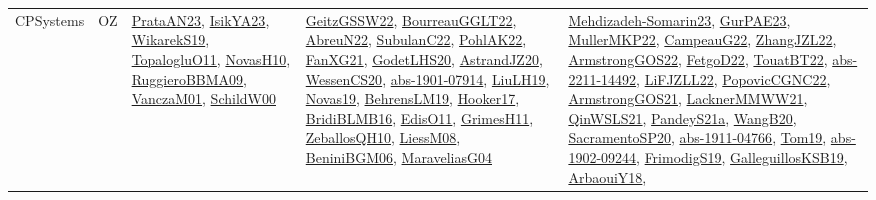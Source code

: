 {\begin{longtable}{lp{3cm}>{\raggedright}p{6cm}>{\raggedright}p{6cm}p{8cm}}
CPSystems & OZ & \href{articles/PrataAN23.pdf}{PrataAN23}\cite{PrataAN23}, \href{articles/IsikYA23.pdf}{IsikYA23}\cite{IsikYA23}, \href{articles/WikarekS19.pdf}{WikarekS19}\cite{WikarekS19}, \href{articles/TopalogluO11.pdf}{TopalogluO11}\cite{TopalogluO11}, \href{articles/NovasH10.pdf}{NovasH10}\cite{NovasH10}, \href{articles/RuggieroBBMA09.pdf}{RuggieroBBMA09}\cite{RuggieroBBMA09}, \href{papers/VanczaM01.pdf}{VanczaM01}\cite{VanczaM01}, \href{articles/SchildW00.pdf}{SchildW00}\cite{SchildW00} & \href{papers/GeitzGSSW22.pdf}{GeitzGSSW22}\cite{GeitzGSSW22}, \href{articles/BourreauGGLT22.pdf}{BourreauGGLT22}\cite{BourreauGGLT22}, \href{articles/AbreuN22.pdf}{AbreuN22}\cite{AbreuN22}, \href{articles/SubulanC22.pdf}{SubulanC22}\cite{SubulanC22}, \href{articles/PohlAK22.pdf}{PohlAK22}\cite{PohlAK22}, \href{articles/FanXG21.pdf}{FanXG21}\cite{FanXG21}, \href{papers/GodetLHS20.pdf}{GodetLHS20}\cite{GodetLHS20}, \href{articles/AstrandJZ20.pdf}{AstrandJZ20}\cite{AstrandJZ20}, \href{papers/WessenCS20.pdf}{WessenCS20}\cite{WessenCS20}, \href{articles/abs-1901-07914.pdf}{abs-1901-07914}\cite{abs-1901-07914}, \href{papers/LiuLH19.pdf}{LiuLH19}\cite{LiuLH19}, \href{articles/Novas19.pdf}{Novas19}\cite{Novas19}, \href{papers/BehrensLM19.pdf}{BehrensLM19}\cite{BehrensLM19}, \href{papers/Hooker17.pdf}{Hooker17}\cite{Hooker17}, \href{articles/BridiBLMB16.pdf}{BridiBLMB16}\cite{BridiBLMB16}, \href{papers/EdisO11.pdf}{EdisO11}\cite{EdisO11}, \href{papers/GrimesH11.pdf}{GrimesH11}\cite{GrimesH11}, \href{articles/ZeballosQH10.pdf}{ZeballosQH10}\cite{ZeballosQH10}, \href{articles/LiessM08.pdf}{LiessM08}\cite{LiessM08}, \href{papers/BeniniBGM06.pdf}{BeniniBGM06}\cite{BeniniBGM06}, \href{papers/MaraveliasG04.pdf}{MaraveliasG04}\cite{MaraveliasG04} & \href{papers/Mehdizadeh-Somarin23.pdf}{Mehdizadeh-Somarin23}\cite{Mehdizadeh-Somarin23}, \href{articles/GurPAE23.pdf}{GurPAE23}\cite{GurPAE23}, \href{articles/MullerMKP22.pdf}{MullerMKP22}\cite{MullerMKP22}, \href{articles/CampeauG22.pdf}{CampeauG22}\cite{CampeauG22}, \href{papers/ZhangJZL22.pdf}{ZhangJZL22}\cite{ZhangJZL22}, \href{papers/ArmstrongGOS22.pdf}{ArmstrongGOS22}\cite{ArmstrongGOS22}, \href{articles/FetgoD22.pdf}{FetgoD22}\cite{FetgoD22}, \href{papers/TouatBT22.pdf}{TouatBT22}\cite{TouatBT22}, \href{articles/abs-2211-14492.pdf}{abs-2211-14492}\cite{abs-2211-14492}, \href{papers/LiFJZLL22.pdf}{LiFJZLL22}\cite{LiFJZLL22}, \href{papers/PopovicCGNC22.pdf}{PopovicCGNC22}\cite{PopovicCGNC22}, \href{papers/ArmstrongGOS21.pdf}{ArmstrongGOS21}\cite{ArmstrongGOS21}, \href{papers/LacknerMMWW21.pdf}{LacknerMMWW21}\cite{LacknerMMWW21}, \href{articles/QinWSLS21.pdf}{QinWSLS21}\cite{QinWSLS21}, \href{articles/PandeyS21a.pdf}{PandeyS21a}\cite{PandeyS21a}, \href{papers/WangB20.pdf}{WangB20}\cite{WangB20}, \href{articles/SacramentoSP20.pdf}{SacramentoSP20}\cite{SacramentoSP20}, \href{articles/abs-1911-04766.pdf}{abs-1911-04766}\cite{abs-1911-04766}, \href{papers/Tom19.pdf}{Tom19}\cite{Tom19}, \href{articles/abs-1902-09244.pdf}{abs-1902-09244}\cite{abs-1902-09244}, \href{papers/FrimodigS19.pdf}{FrimodigS19}\cite{FrimodigS19}, \href{papers/GalleguillosKSB19.pdf}{GalleguillosKSB19}\cite{GalleguillosKSB19}, \href{papers/ArbaouiY18.pdf}{ArbaouiY18}\cite{ArbaouiY18}, 
\end{longtable}}
